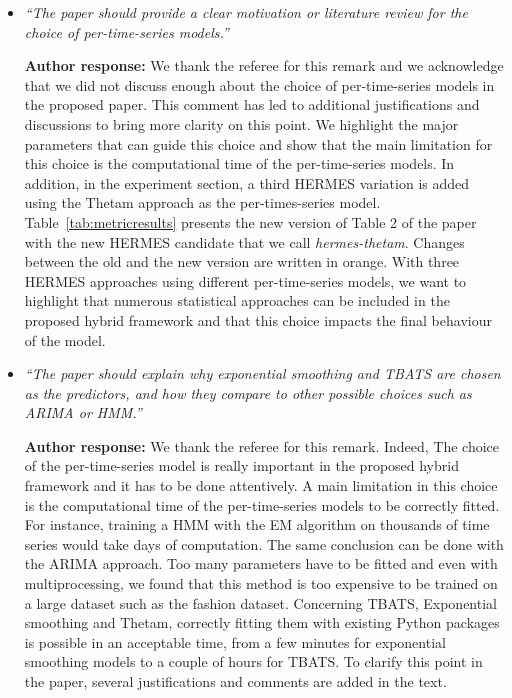 \documentclass[10pt]{article} %
\begin{document}
\begin{itemize}
	
	\item {\em ``The paper should provide a clear motivation or literature review for the choice of per-time-series models.''} \medskip
	
	\textbf{Author response:} We thank the referee for this remark and we acknowledge that we did not discuss enough about the choice of per-time-series models in the proposed paper. This comment has led to additional justifications and discussions to bring more clarity on this point. We highlight the major parameters that can guide this choice and show that the main limitation for this choice is the computational time of the per-time-series models. In addition, in the experiment section, a third HERMES variation is added using the Thetam approach as the per-times-series model. Table~\ref{tab:metricresults} presents the new version of Table 2 of the paper with the new HERMES candidate that we call \textit{hermes-thetam}. Changes between the old and the new version are written in orange. With three HERMES approaches using different per-time-series models, we want to highlight that numerous statistical approaches can be included in the proposed hybrid framework and that this choice impacts the final behaviour of the model.\\
	
	\item {\em ``The paper should explain why exponential smoothing and TBATS are chosen as the predictors, and how they compare to other possible choices such as ARIMA or HMM.''} \medskip
	
	\textbf{Author response:} We thank the referee for this remark. Indeed, The choice of the per-time-series model is really important in the proposed hybrid framework and it has to be done attentively. A main limitation in this choice is the computational time of the per-time-series models to be correctly fitted. For instance, training a HMM with the EM algorithm on thousands of time series would take days of computation. The same conclusion can be done with the ARIMA approach. Too many parameters have to be fitted and even with multiprocessing, we found that this method is too expensive to be trained on a large dataset such as the fashion dataset. Concerning TBATS, Exponential smoothing and Thetam, correctly fitting them with existing Python packages is possible in an acceptable time, from a few minutes for exponential smoothing models to a couple of hours for TBATS. To clarify this point in the paper, several justifications and comments are added in the text.\\
	

\end{itemize}
\end{document}
